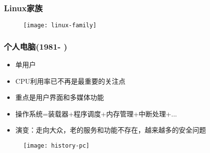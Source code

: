 %    
%    
%    
\begin{frame}
    \frametitle{Linux家族}
    
    \begin{figure}
        \centering
        \texttt{[image: linux-family]}
    \end{figure}
    
\end{frame}
\begin{frame}[plain]
	
	\frametitle{个人电脑(1981- )}
	
	
	\begin{itemize}
		\item 单用户
		\item CPU利用率已不再是最重要的关注点	
		\item 重点是用户界面和多媒体功能
		\item 操作系统=装载器+程序调度+内存管理+中断处理+...
		\item 演变：走向大众，老的服务和功能不存在，越来越多的安全问题
	\end{itemize}
	
	\begin{figure}
		\centering
		\texttt{[image: history-pc]}
	\end{figure}
	
\end{frame}

